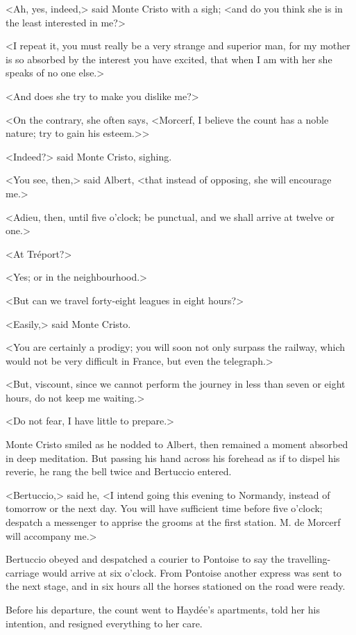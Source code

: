  <Ah, yes, indeed,> said Monte Cristo with a sigh; <and do you think she is in the least interested in me?> 

 <I repeat it, you must really be a very strange and superior man, for my mother is so absorbed by the interest you have excited, that when I am with her she speaks of no one else.> 

 <And does she try to make you dislike me?> 

 <On the contrary, she often says, <Morcerf, I believe the count has a noble nature; try to gain his esteem.>> 

 <Indeed?> said Monte Cristo, sighing. 

 <You see, then,> said Albert, <that instead of opposing, she will encourage me.> 

 <Adieu, then, until five o'clock; be punctual, and we shall arrive at twelve or one.> 

 <At Tréport?> 

 <Yes; or in the neighbourhood.> 

 <But can we travel forty-eight leagues in eight hours?> 

 <Easily,> said Monte Cristo. 

 <You are certainly a prodigy; you will soon not only surpass the railway, which would not be very difficult in France, but even the telegraph.> 

 <But, viscount, since we cannot perform the journey in less than seven or eight hours, do not keep me waiting.> 

 <Do not fear, I have little to prepare.> 

 Monte Cristo smiled as he nodded to Albert, then remained a moment absorbed in deep meditation. But passing his hand across his forehead as if to dispel his reverie, he rang the bell twice and Bertuccio entered. 

 <Bertuccio,> said he, <I intend going this evening to Normandy, instead of tomorrow or the next day. You will have sufficient time before five o'clock; despatch a messenger to apprise the grooms at the first station. M. de Morcerf will accompany me.> 

 Bertuccio obeyed and despatched a courier to Pontoise to say the travelling-carriage would arrive at six o'clock. From Pontoise another express was sent to the next stage, and in six hours all the horses stationed on the road were ready. 

 Before his departure, the count went to Haydée's apartments, told her his intention, and resigned everything to her care. 

